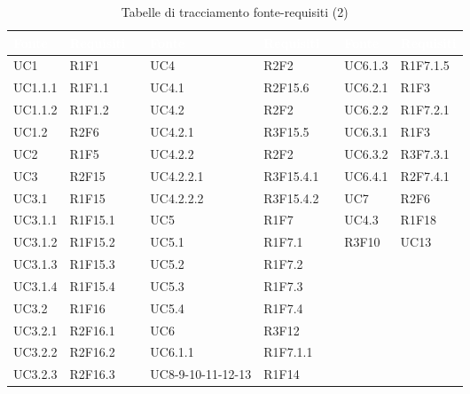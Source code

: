 {
\setlength\arrayrulewidth{1pt}
\begin{longtable}{C{2cm} | C{2cm} C{0.5cm} C{2cm} | C{2cm} C{0.5cm} C{2cm} C{2cm}}
		\textcolor{white}{\textbf{Fonte}} & 
		\textcolor{white}{\textbf{Requisiti}} &
		 &
		\textcolor{white}{\textbf{Fonte}} & 
		\textcolor{white}{\textbf{Requisiti}} &
		 &
		\textcolor{white}{\textbf{Fonte}} & 
		\textcolor{white}{\textbf{Requisiti}} \\
		\endfirsthead
	    
	    \endfoot
	    \caption{Tabelle di tracciamento fonte-requisiti (2)}
	    \endlastfoot


UC1 & R1F1 &  & UC4 & R2F2 &  & UC6.1.3 & R1F7.1.5\\

UC1.1.1 & R1F1.1 &  & UC4.1 & R2F15.6 &  & UC6.2.1 & R1F3\\

UC1.1.2 & R1F1.2 &  & UC4.2 & R2F2 &  & UC6.2.2 & R1F7.2.1\\

UC1.2 & R2F6 &  & UC4.2.1 & R3F15.5 &  & UC6.3.1 & R1F3\\

UC2 & R1F5 &  & UC4.2.2 & R2F2 &   & UC6.3.2 & R3F7.3.1\\

UC3 & R2F15 &  & UC4.2.2.1 & R3F15.4.1 &  & UC6.4.1 & R2F7.4.1\\

UC3.1 & R1F15 &  & UC4.2.2.2 & R3F15.4.2 &  & UC7 & R2F6\\

UC3.1.1 & R1F15.1 &  & UC5 & R1F7 &  & UC4.3 & R1F18\\

UC3.1.2 & R1F15.2 &  & UC5.1 & R1F7.1 &  & R3F10 & UC13\\

UC3.1.3 & R1F15.3 &  & UC5.2 & R1F7.2 &  & & \\

UC3.1.4 & R1F15.4 &  & UC5.3 & R1F7.3 &  & &\\
UC3.2 & R1F16 &  & UC5.4 & R1F7.4 &  & &\\
UC3.2.1 & R2F16.1 &  & UC6 & R3F12 &  & &\\
UC3.2.2 & R2F16.2 &  & UC6.1.1 & R1F7.1.1 &  & &\\
UC3.2.3 & R2F16.3 &  & UC8-9-10-11-12-13 & R1F14 &  & &\\

\end{longtable}
}